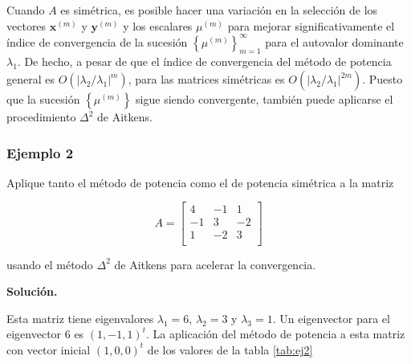 \documentclass[12pt, a4paper]{article}
\numberwithin{subsection}{section} %
\begin{document}
        Cuando $A$ es simétrica, es posible hacer una variación en la selección de los vectores $\textbf{x}^{\left( m \right)}$ y $\textbf{y}^{\left( m \right)}$ y los escalares $\mu^{\left( m \right)}$ para mejorar significativamente el índice de convergencia de la sucesión $\left\{ \mu^{\left( m \right)} \right\}_{m=1}^{\infty}$ para el autovalor dominante $\lambda_{1}$. De hecho, a pesar de que el índice de convergencia del método de potencia general es $O\left( \left| \lambda_{2} / \lambda_{1} \right|^{m} \right)$, para las matrices simétricas es $O\left( \left| \lambda_{2} / \lambda_{1} \right|^{2m} \right)$. Puesto que la sucesión $\left\{ \mu^{\left( m \right)} \right\}$ sigue siendo convergente, también puede aplicarse el procedimiento $\Delta ^{2}$ de Aitkens.
        
        \subsubsection*{Ejemplo 2} %
        
            Aplique tanto el método de potencia como el de potencia simétrica a la matriz
        
            $$A =\begin{bmatrix}
                4 & -1 & 1 \\
                -1 & 3 & -2 \\
                1 & -2 & 3 \\
            \end{bmatrix}$$
        
            usando el método $\Delta^2$ de Aitkens para acelerar la convergencia.
        
            {\bf Solución.}
        
            Esta matriz tiene eigenvalores $\lambda_1 = 6$, $\lambda_2 = 3$ y $\lambda_3 = 1$. Un eigenvector para el eigenvector 6 es $(1,-1, 1)^t$. La aplicación del método de potencia a esta matriz con vector inicial $(1, 0, 0)^t$ de los valores de la tabla \ref{tab:ej2}
        
\end{document}
